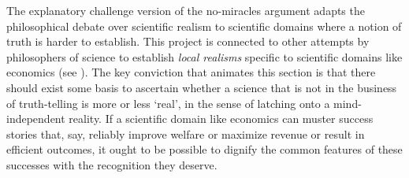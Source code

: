 The explanatory challenge version of the no-miracles argument adapts the philosophical debate over scientific realism to scientific domains where a notion of truth is harder to establish. This project is connected to other attempts by philosophers of science to establish \textit{local realisms} specific to scientific domains like economics (see \cite{maki2009}). The key conviction that animates this section is that there should exist some basis to ascertain whether a science that is not in the business of truth-telling is more or less `real', in the sense of latching onto a mind-independent reality. If a scientific domain like economics can muster success stories that, say, reliably improve welfare or maximize revenue or result in efficient outcomes, it ought to be possible to dignify the common features of these successes with the recognition they deserve. 







    

